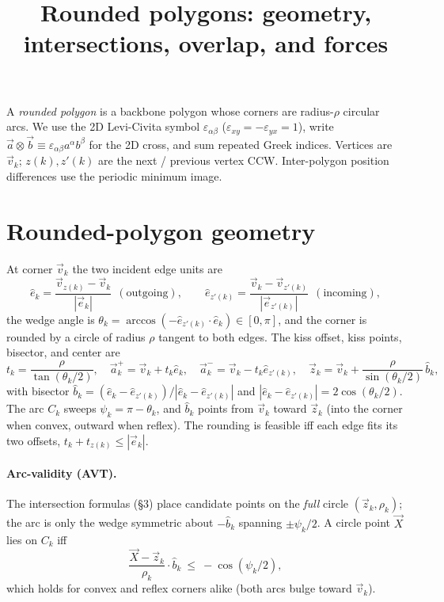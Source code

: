 \documentclass[11pt]{article}
\title{Rounded polygons: geometry, intersections, overlap, and forces}
\date{}
\author{}
\numberwithin{equation}{section}
\newcommand{\vv}[1]{\vec{#1}}
\begin{document}
\maketitle

A \emph{rounded polygon} is a backbone polygon whose corners are radius-$\rho$ circular arcs. We
use the 2D Levi-Civita symbol $\varepsilon_{\alpha\beta}$ ($\varepsilon_{xy}=-\varepsilon_{yx}=1$),
write $\vv a\otimes\vv b\equiv\varepsilon_{\alpha\beta}a^{\alpha}b^{\beta}$ for the 2D cross, and sum
repeated Greek indices. Vertices are $\vv v_k$; $z(k),z'(k)$ are the next / previous vertex CCW.
Inter-polygon position differences use the periodic minimum image.

\section{Rounded-polygon geometry}

At corner $\vv v_k$ the two incident edge units are
\begin{equation}
  \hat e_k=\frac{\vv v_{z(k)}-\vv v_k}{|\vv e_k|}\ \ (\text{outgoing}),\qquad
  \hat e_{z'(k)}=\frac{\vv v_k-\vv v_{z'(k)}}{|\vv e_{z'(k)}|}\ \ (\text{incoming}),
\end{equation}
the wedge angle is $\theta_k=\arccos(-\hat e_{z'(k)}\!\cdot\!\hat e_k)\in[0,\pi]$, and the corner is
rounded by a circle of radius $\rho$ tangent to both edges. The kiss offset, kiss points, bisector,
and center are
\begin{equation}
  t_k=\frac{\rho}{\tan(\theta_k/2)},\quad
  \vv a^{+}_k=\vv v_k+t_k\hat e_k,\quad
  \vv a^{-}_k=\vv v_k-t_k\hat e_{z'(k)},\quad
  \vv z_k=\vv v_k+\frac{\rho}{\sin(\theta_k/2)}\,\hat b_k,
\end{equation}
with bisector $\hat b_k=(\hat e_k-\hat e_{z'(k)})/|\hat e_k-\hat e_{z'(k)}|$ and $|\hat e_k-\hat
e_{z'(k)}|=2\cos(\theta_k/2)$. The arc $C_k$ sweeps $\psi_k=\pi-\theta_k$, and $\hat b_k$ points from
$\vv v_k$ toward $\vv z_k$ (into the corner when convex, outward when reflex). The rounding is
feasible iff each edge fits its two offsets, $t_k+t_{z(k)}\le|\vv e_k|$.

\paragraph{Arc-validity (AVT).} The intersection formulas (\S3) place candidate points on the
\emph{full} circle $(\vv z_k,\rho_k)$; the arc is only the wedge symmetric about $-\hat b_k$ spanning
$\pm\psi_k/2$. A circle point $\vv X$ lies on $C_k$ iff
\begin{equation}
  \frac{\vv X-\vv z_k}{\rho_k}\cdot\hat b_k\ \le\ -\cos(\psi_k/2),
\end{equation}
which holds for convex and reflex corners alike (both arcs bulge toward $\vv v_k$).
\end{document}
